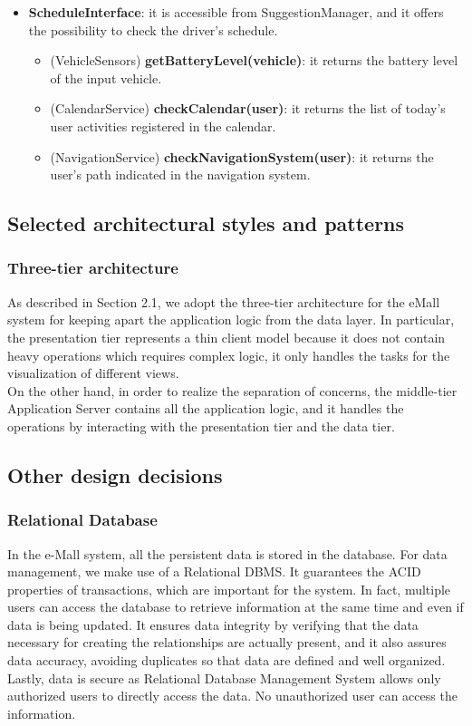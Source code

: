 \documentclass[../main.tex]{subfiles}
\begin{document}
\begin{itemize}
    \item \textbf{ScheduleInterface}: it is accessible from SuggestionManager, and it offers the possibility to check the driver's schedule.
    \begin{itemize}
        \item (VehicleSensors) \textbf{getBatteryLevel(vehicle)}: it returns the battery level of the input vehicle.
        \item (CalendarService) \textbf{checkCalendar(user)}: it returns the list of today's user activities registered in the calendar. 
        \item (NavigationService) \textbf{checkNavigationSystem(user)}: it returns the user's path indicated in the navigation system.
    \end{itemize}
\end{itemize}



\subsection{Selected architectural styles and patterns}
\subsubsection{Three-tier architecture}
As described in Section 2.1, we adopt the three-tier architecture for the eMall system for keeping apart the application logic from the data layer. In particular, the presentation tier represents a thin client model because it does not contain heavy operations which requires complex logic, it only handles the tasks for the visualization of different views. 
\\
On the other hand, in order to realize the separation of concerns, the middle-tier Application Server contains all the application logic, and it handles the operations by interacting with the presentation tier and the data tier.


\subsection{Other design decisions}

\subsubsection{Relational Database}
In the e-Mall system, all the persistent data is stored in the database. For data management, we make use of a Relational DBMS. It guarantees the ACID properties of transactions, which are important for the system. In fact, multiple users can access the database to retrieve information at the same time and even if data is being updated. It ensures data integrity by verifying that the data necessary for creating the relationships are actually present, and it also assures data accuracy, avoiding duplicates so that data are defined and well organized. Lastly, data is secure as Relational Database Management System allows only authorized users to directly access the data. No unauthorized user can access the information.
\end{document}
